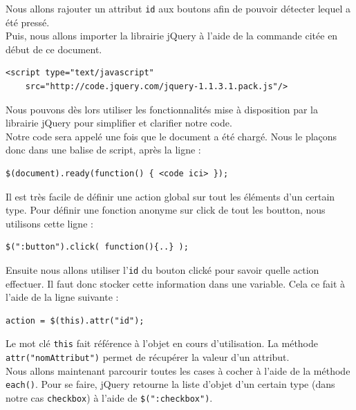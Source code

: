 \documentclass[10pt,a4paper,titlepage]{article}
\begin{document}
Nous allons rajouter un attribut \texttt{id} aux boutons afin de pouvoir détecter lequel a été pressé. \\

Puis, nous allons importer la librairie jQuery à l'aide de la commande citée en début de ce document. 

\begin{lstlisting}
<script type="text/javascript" 
	src="http://code.jquery.com/jquery-1.1.3.1.pack.js"/>
\end{lstlisting}

Nous pouvons dès lors utiliser les fonctionnalités mise à disposition par la librairie jQuery pour simplifier et clarifier notre code. \\

Notre code sera appelé une fois que le document a été chargé. Nous le plaçons donc dans une balise de script, après la ligne :

\begin{lstlisting}
$(document).ready(function() { <code ici> });
\end{lstlisting}

Il est très facile de définir une action global sur tout les éléments d'un certain type. Pour définir une fonction anonyme sur click de tout les boutton, nous utilisons cette ligne : \\

\begin{lstlisting}
$(":button").click( function(){..} );
\end{lstlisting}

Ensuite nous allons utiliser l'\texttt{id} du bouton clické pour savoir quelle action effectuer. Il faut donc stocker cette information dans une variable. Cela ce fait à l'aide de la ligne suivante : \\

\begin{lstlisting}
action = $(this).attr("id");
\end{lstlisting}

Le mot clé \texttt{this} fait référence à l'objet en cours d'utilisation. La méthode \texttt{attr("nomAttribut")} permet de récupérer la valeur d'un attribut. \\

Nous allons maintenant parcourir toutes les cases à cocher à l'aide de la méthode \texttt{each()}. Pour se faire, jQuery retourne la liste d'objet d'un certain type (dans notre cas \texttt{checkbox}) à l'aide de \verb!$(":checkbox")!.  \\ 
\end{document}
